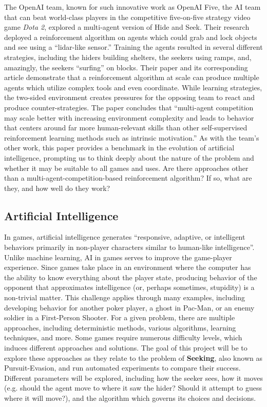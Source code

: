 \documentclass[12pt]{article}
\begin{document}
The OpenAI team, known for such innovative work as OpenAI Five, the AI team that can beat world-class players in the competitive five-on-five strategy video game \textit{Dota 2}, explored a multi-agent version of Hide and Seek\cite{BakerPaper,OpenAI}. Their research deployed a reinforcement algorithm on agents which could grab and lock objects and see using a ``lidar-like sensor.'' Training the agents resulted in several different strategies, including the hiders building shelters, the seekers using ramps, and, amazingly, the seekers ``surfing'' on blocks. Their paper and its corresponding article demonstrate that a reinforcement algorithm at scale can produce multiple agents which utilize complex tools and even coordinate. While learning strategies, the two-sided environment creates pressures for the opposing team to react and produce counter-strategies. The paper concludes that ``multi-agent competition may scale better with increasing environment complexity and leads to behavior that centers around far more human-relevant skills than other self-supervised reinforcement learning methods such as intrinsic motivation.'' As with the team's other work, this paper provides a benchmark in the evolution of artificial intelligence, prompting us to think deeply about the nature of the problem and whether it may be suitable to all games and uses. Are there approaches other than a multi-agent-competition-based reinforcement algorithm? If so, what are they, and how well do they work?

\subsection{Artificial Intelligence}
In games, artificial intelligence generates ``responsive, adaptive, or intelligent behaviors primarily in non-player characters similar to human-like intelligence''\cite{AIDef}. Unlike machine learning, AI in games serves to improve the game-player experience. Since games take place in an environment where the computer has the ability to know everything about the player state, producing behavior of the opponent that approximates intelligence (or, perhaps sometimes, stupidity) is a non-trivial matter. This challenge applies through many examples, including developing behavior for another poker player, a ghost in Pac-Man, or an enemy soldier in a First-Person Shooter. For a given problem, there are multiple approaches, including deterministic methods, various algorithms, learning techniques, and more. Some games require numerous difficulty levels, which induces different approaches and solutions. 
The goal of this project will be to explore these approaches as they relate to the problem of \textbf{Seeking}, also known as Pursuit-Evasion, and run automated experiments to compare their success. Different parameters will be explored, including how the seeker sees, how it moves (e.g. should the agent move to where it saw the hider? Should it attempt to guess where it will move?), and the algorithm which governs its choices and decisions.
\end{document}
